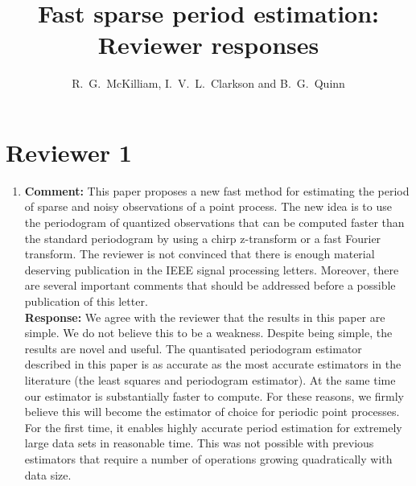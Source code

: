 \documentclass[a4paper,10pt]{article}
\title{Fast sparse period estimation: Reviewer responses}
\author{R.~G.~McKilliam, I.~V.~L.~Clarkson and B.~G.~Quinn 
}
\begin{document}
\maketitle


\section*{Reviewer 1}\label{sec:reviewer-1}

\begin{enumerate}
 
\item\textbf{Comment:}
This paper proposes a new fast method for estimating the period of sparse and noisy
observations of a point process. The new idea is to use the periodogram of quantized
observations that can be computed faster than the standard periodogram by using
a chirp z-transform or a fast Fourier transform. The reviewer is not convinced that
there is enough material deserving publication in the IEEE signal processing letters.
Moreover, there are several important comments that should be addressed before a
possible publication of this letter.
\\
\textbf{Response:}
We agree with the reviewer that the results in this paper are simple.  We do not believe this to be a weakness. Despite being simple, the results are novel and useful.  The quantisated periodogram estimator described in this paper is as accurate as the most accurate estimators in the literature (the least squares and periodogram estimator).  At the same time our estimator is substantially faster to compute.  For these reasons, we firmly believe this will become the estimator of choice for periodic point processes.  For the first time, it enables highly accurate period estimation for extremely large data sets in reasonable time. This was not possible with previous estimators that require a number of operations growing quadratically with data size. %


\end{enumerate}
\end{document}
